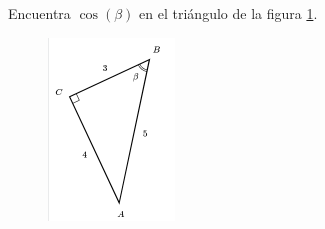 Encuentra $\cos(\beta)$ en el triángulo de la figura \ref{fig:functrig01}.
\begin{figure}[H]
    \begin{center}
        \includegraphics[width=0.3\textwidth]{../images/functrig01.png}
    \end{center}
    \caption{}
    \label{fig:functrig01}
\end{figure}
